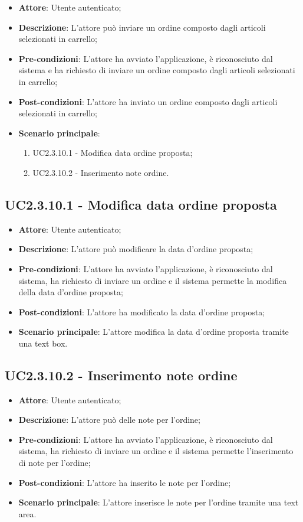 \begin{itemize}
	\item \textbf{Attore}: Utente autenticato;
	\item \textbf{Descrizione}: L'attore può inviare un ordine composto dagli articoli selezionati in carrello;
	\item \textbf{Pre-condizioni}: L'attore ha avviato l'applicazione, è riconosciuto dal sistema e ha richiesto di inviare un ordine composto dagli articoli selezionati in carrello;
	\item \textbf{Post-condizioni}: L'attore ha inviato un ordine composto dagli articoli selezionati in carrello;
	\item \textbf{Scenario principale}:
		\begin{enumerate}
			\item UC2.3.10.1 - Modifica data ordine proposta;
			\item UC2.3.10.2 - Inserimento note ordine.
		\end{enumerate}
\end{itemize}

\subsection{UC2.3.10.1 - Modifica data ordine proposta}

\begin{itemize}
	\item \textbf{Attore}: Utente autenticato;
	\item \textbf{Descrizione}: L'attore può modificare la data d'ordine proposta;
	\item \textbf{Pre-condizioni}: L'attore ha avviato l'applicazione, è riconosciuto dal sistema, ha richiesto di inviare un ordine e il sistema permette la modifica della data d'ordine proposta;
	\item \textbf{Post-condizioni}: L'attore ha modificato la data d'ordine proposta;
	\item \textbf{Scenario principale}: L'attore modifica la data d'ordine proposta tramite una text box.
\end{itemize}

\subsection{UC2.3.10.2 - Inserimento note ordine}

\begin{itemize}
	\item \textbf{Attore}: Utente autenticato;
	\item \textbf{Descrizione}: L'attore può delle note per l'ordine;
	\item \textbf{Pre-condizioni}: L'attore ha avviato l'applicazione, è riconosciuto dal sistema, ha richiesto di inviare un ordine e il sistema permette l'inserimento di note per l'ordine;
	\item \textbf{Post-condizioni}: L'attore ha inserito le note per l'ordine;
	\item \textbf{Scenario principale}: L'attore inserisce le note per l'ordine tramite una text area.
\end{itemize}

